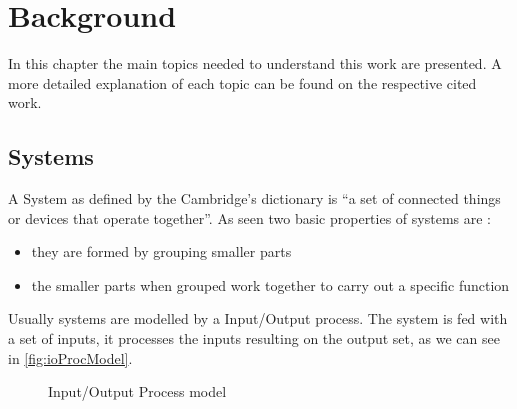 
\chapter{Background}
\label{cha:background}
In this chapter the main topics needed to understand this work are presented. A more
detailed explanation of each topic can be found on the respective cited work.
\section{Systems}

A System as defined by the Cambridge's dictionary is ``a set of connected things
or devices that operate together''. As seen two basic properties of systems are
:
\begin{itemize}
\item they are formed by grouping smaller parts
\item the smaller parts when grouped work together to carry out a specific
  function
\end{itemize}

Usually systems are modelled by a Input\slash Output process. The system is fed with a
set of inputs, it processes the inputs resulting on the output set, as we can see
in \autoref{fig:ioProcModel}.

\begin{figure}[H]
  \centering
  \caption{Input\slash Output Process model}
    \label{fig:ioProcModel}
\end{figure}

